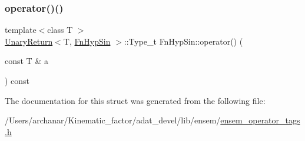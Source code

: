 \mbox{\label{structFnHypSin_adea3b5d45ae2d7b5ab84b310d4d4e339}} 
\subsubsection{\texorpdfstring{operator()()}{operator()()}\hspace{0.1cm}{\footnotesize\ttfamily [2/2]}}
{\footnotesize\ttfamily template$<$class T $>$ \\
\mbox{\hyperlink{structUnaryReturn}{Unary\+Return}}$<$T, \mbox{\hyperlink{structFnHypSin}{Fn\+Hyp\+Sin}} $>$\+::Type\+\_\+t Fn\+Hyp\+Sin\+::operator() (\begin{DoxyParamCaption}\item[{const T \&}]{a }\end{DoxyParamCaption}) const\hspace{0.3cm}{\ttfamily [inline]}}



The documentation for this struct was generated from the following file\+:\begin{DoxyCompactItemize}
\item 
/\+Users/archanar/\+Kinematic\+\_\+factor/adat\+\_\+devel/lib/ensem/\mbox{\hyperlink{lib_2ensem_2ensem__operator__tags_8h}{ensem\+\_\+operator\+\_\+tags.\+h}}\end{DoxyCompactItemize}
